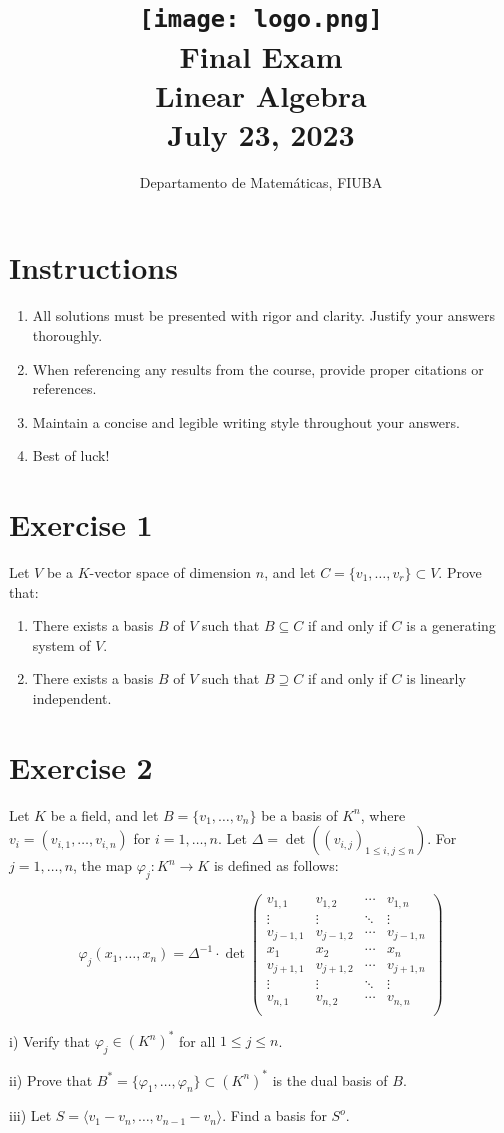 \documentclass[12pt]{article}
\title{\texttt{[image: logo.png]}\\[0.5cm]\textbf{\Huge Final Exam}\\ \Large Linear Algebra\\ \Large July 23, 2023}
\author{\Large Departamento de Matemáticas, FIUBA}
\date{}
\begin{document}
	
	\maketitle
	\thispagestyle{empty}
	
	\section{Instructions}\label{sec:instructions}
	\begin{enumerate}
		\item All solutions must be presented with rigor and clarity. Justify your answers thoroughly.
		\item When referencing any results from the course, provide proper citations or references.
		\item Maintain a concise and legible writing style throughout your answers.
		\item Best of luck!
	\end{enumerate}
	
	\section{Exercise 1}\label{sec:e1}
	Let \(V\) be a \(K\)-vector space of dimension \(n\), and let \(C = \{v_1, \ldots, v_r\} \subset V\). Prove that:
	
	\begin{enumerate}[label=(\roman*)]
		\item There exists a basis \(B\) of \(V\) such that \(B \subseteq C\) if and only if \(C\) is a generating system of \(V\).
		\item There exists a basis \(B\) of \(V\) such that \(B \supseteq C\) if and only if \(C\) is linearly independent.
	\end{enumerate}
	
	\section{Exercise 2}\label{sec:e2}
	Let \(K\) be a field, and let \(B = \{v_1, \ldots, v_n\}\) be a basis of \(K^n\), where \(v_i = (v_{i,1}, \ldots, v_{i,n})\) for \(i = 1, \ldots, n\). Let \(\Delta = \det((v_{i,j})_{1\leq i,j \leq n})\). For \(j = 1, \ldots, n\), the map \(\varphi_j : K^n \rightarrow K\) is defined as follows:
	
	\[
	\varphi_j (x_1, \ldots, x_n) = \Delta^{-1} \cdot \det
	\begin{pmatrix}
		v_{1,1} & v_{1,2} & \cdots & v_{1,n} \\
		\vdots & \vdots & \ddots & \vdots \\
		v_{j-1,1} & v_{j-1,2} & \cdots & v_{j-1,n} \\
		x_1 & x_2 & \cdots & x_n \\
		v_{j+1,1} & v_{j+1,2} & \cdots & v_{j+1,n} \\
		\vdots & \vdots & \ddots & \vdots \\
		v_{n,1} & v_{n,2} & \cdots & v_{n,n} \\
	\end{pmatrix}
	\]
	
	i) Verify that \(\varphi_j \in (K^n)^*\) for all \(1 \leq j \leq n\).
	
	ii) Prove that \(B^* = \{\varphi_1, \ldots, \varphi_n\} \subset (K^n)^*\) is the dual basis of \(B\).
	
iii) Let \(S = \langle v_1 - v_n, \ldots, v_{n-1} - v_n \rangle\). Find a basis for \(S^{o}\).

	
\end{document}
